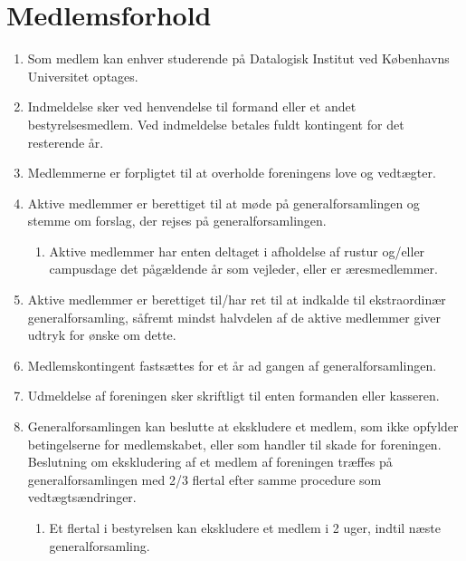 \documentclass[a4paper, 10pt]{article}
\renewcommand\thesection{\textsection\arabic{section}}
\newenvironment{stykenum}{
  \begin{enumerate}[%
    label=Stk.~\arabic*:, ref=\thesection~Stk.~\arabic{enumi}, start=1]
}{\end{enumerate}}
\newenvironment{substykenum}{
  \begin{enumerate}[%
          label=Stk.~\arabic{enumi}.\arabic*:,
      ref=\thesection~Stk.~\arabic{enumi}.\arabic*, start=1]
}{\end{enumerate}}
\begin{document}
\section{Medlemsforhold}
\begin{stykenum}
    \item Som medlem kan enhver studerende på Datalogisk Institut ved Københavns
        Universitet optages.

    \item Indmeldelse sker ved henvendelse til formand eller et andet
        bestyrelsesmedlem. Ved indmeldelse betales fuldt kontingent for det
        resterende år.

    \item Medlemmerne er forpligtet til at overholde foreningens love og
        vedtægter.

    \item Aktive medlemmer er berettiget til at møde på generalforsamlingen og
        stemme om forslag, der rejses på generalforsamlingen.
        \begin{substykenum}
            \item Aktive medlemmer har enten deltaget i afholdelse af rustur
                og/eller campusdage det pågældende år som vejleder, eller er
                æresmedlemmer.
        \end{substykenum}

    \item Aktive medlemmer  er berettiget til/har ret til at indkalde til
        ekstraordinær generalforsamling, såfremt mindst halvdelen af de aktive
        medlemmer giver udtryk for ønske om dette.

    \item Medlemskontingent fastsættes for et år ad gangen af
        generalforsamlingen.

    \item Udmeldelse af foreningen sker skriftligt til enten formanden eller
        kasseren.

    \item Generalforsamlingen kan beslutte at ekskludere et medlem, som ikke
        opfylder betingelserne for medlemskabet, eller som handler til skade for
        foreningen. Beslutning om ekskludering af et medlem af foreningen
        træffes på generalforsamlingen med 2/3 flertal efter samme procedure som
        vedtægtsændringer.
        \begin{substykenum}
        \item Et flertal i bestyrelsen kan ekskludere et medlem i 2 uger, indtil
            næste  generalforsamling.
        \end{substykenum}


\end{stykenum}
\end{document}
